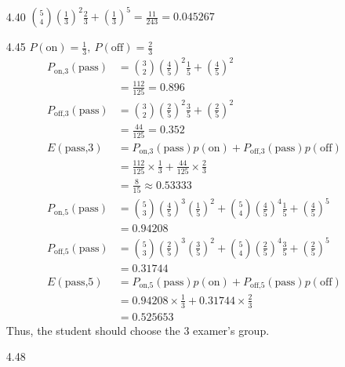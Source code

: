 \documentclass{article}
\begin{document}
\begin{itemize}
\begin{itemize}
\begin{align*}
        \end{align*}
    \end{itemize}
    \item [4.40] \(\binom{5}{4}\left(\frac{1}{3}\right)^2\frac{2}{3}+\left(\frac{1}{3}\right)^5=\frac{11}{243} = 0.045267\)
    \newpage
    \item [4.45] \(P(\text{on}) = \frac{1}{3},\ P(\text{off}) = \frac{2}{3}\)\\
                \begin{align*}
                    P_{\text{on,3}}(\text{pass}) &= \binom{3}{2}\left( \frac{4}{5}\right)^2\frac{1}{5}+\left(\frac{4}{5}\right)^2\\
                    &= \frac{112}{125}=0.896\\
                    P_{\text{off,3}}(\text{pass})&= \binom{3}{2}\left( \frac{2}{5}\right)^2\frac{3}{5}+\left(\frac{2}{5}\right)^2\\
                    &=\frac{44}{125}=0.352\\
                    E(\text{pass,3})&=P_{\text{on,3}}(\text{pass})p(\text{on})+P_{\text{off,3}}(\text{pass})p(\text{off})\\
                    &=\frac{112}{125}\times \frac{1}{3}+\frac{44}{125}\times\frac{2}{3}\\
                    &=\frac{8}{15}\approx 0.53333\\
                    P_{\text{on,5}}(\text{pass}) &=\binom{5}{3}\left(\frac{4}{5}\right)^3\left(\frac{1}{5}\right)^2 +\binom{5}{4}\left(\frac{4}{5}\right)^4\frac{1}{5} +\left(\frac{4}{5}\right)^5\\
                    &=0.94208\\
                    P_{\text{off,5}}(\text{pass}) & = \binom{5}{3}\left(\frac{2}{5}\right)^3\left(\frac{3}{5}\right)^2 +\binom{5}{4}\left(\frac{2}{5}\right)^4\frac{3}{5} +\left(\frac{2}{5}\right)^5\\
                    &=0.31744\\
                    E(\text{pass,5})&=P_{\text{on,5}}(\text{pass})p(\text{on})+P_{\text{off,5}}(\text{pass})p(\text{off})\\
                    &=0.94208\times \frac{1}{3}+0.31744\times\frac{2}{3}\\
                    &=0.525653
                \end{align*}
                Thus, the student should choose the 3 examer's group.
    \item [4.48] 
    \begin{align*}

\end{align*}
\end{itemize}
\end{document}
